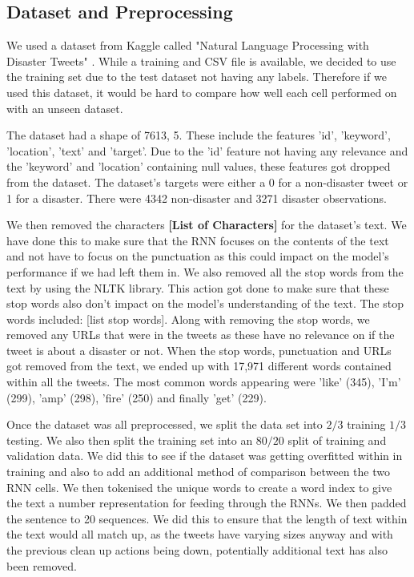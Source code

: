 \documentclass[a4paper,10pt]{article}
\begin{document}
\subsection{Dataset and Preprocessing}
	We used a dataset from Kaggle called "Natural Language Processing with Disaster Tweets" \cite{disater_kaggle}. While a training and CSV file is available, we decided to use the training set due to the test dataset not having any labels. Therefore if we used this dataset, it would be hard to compare how well each cell performed on with an unseen dataset.

	The dataset had a shape of 7613, 5. These include the features 'id', 'keyword', 'location', 'text' and 'target'. Due to the 'id' feature not having any relevance and the 'keyword' and 'location' containing null values, these features got dropped from the dataset. The dataset's targets were either a 0 for a non-disaster tweet or 1 for a disaster. There were 4342 non-disaster and 3271 disaster observations.

	We then removed the characters \textbf{[List of Characters]} for the dataset's text. We have done this to make sure that the RNN focuses on the contents of the text and not have to focus on the punctuation as this could impact on the model's performance if we had left them in. We also removed all the stop words from the text by using the NLTK library. This action got done to make sure that these stop words also don't impact on the model's understanding of the text. The stop words included: [list stop words]. Along with removing the stop words, we removed any URLs that were in the tweets as these have no relevance on if the tweet is about a disaster or not. When the stop words, punctuation and URLs got removed from the text, we ended up with 17,971 different words contained within all the tweets. The most common words appearing were 'like' (345), 'I'm' (299), 'amp' (298), 'fire' (250) and finally 'get' (229).
	
	Once the dataset was all preprocessed, we split the data set into $2/3$ training $1/3$ testing. We also then split the training set into an $80/20$ split of training and validation data. We did this to see if the dataset was getting overfitted within in training and also to add an additional method of comparison between the two RNN cells. We then tokenised the unique words to create a word index to give the text a number representation for feeding through the RNNs. We then padded the sentence to 20 sequences. We did this to ensure that the length of text within the text would all match up, as the tweets have varying sizes anyway and with the previous clean up actions being down, potentially additional text has also been removed.  
	
\end{document}
